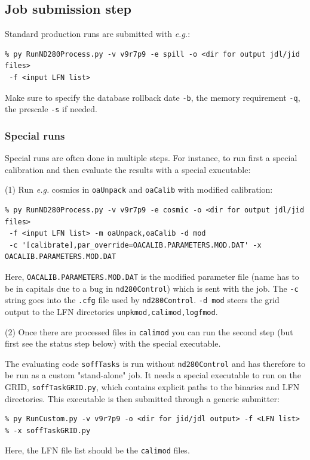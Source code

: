 \documentclass[11pt]{article}
\begin{document}
\subsection{Job submission step}

Standard production runs are submitted with \textit{e.g.}:
\begin{verbatim}
% py RunND280Process.py -v v9r7p9 -e spill -o <dir for output jdl/jid files>
 -f <input LFN list>
\end{verbatim}

Make sure to specify the database rollback date \verb+-b+, the memory
requirement \verb+-q+, the prescale \verb+-s+ if needed.

\subsubsection*{Special runs}

Special runs are often done in multiple steps. For instance, to run
first a special calibration and then evaluate the results with a
special exucutable:

(1) Run \textit{e.g.} cosmics in \verb+oaUnpack+ and \verb+oaCalib+ with modified calibration:
\begin{verbatim}
% py RunND280Process.py -v v9r7p9 -e cosmic -o <dir for output jdl/jid files>
 -f <input LFN list> -m oaUnpack,oaCalib -d mod 
 -c '[calibrate],par_override=OACALIB.PARAMETERS.MOD.DAT' -x OACALIB.PARAMETERS.MOD.DAT
\end{verbatim}
Here, \verb+OACALIB.PARAMETERS.MOD.DAT+ is the modified parameter file
(name has to be in capitals due to a bug in \verb+nd280Control+) which
is sent with the job. The \verb+-c+ string goes into the \verb+.cfg+
file used by \verb+nd280Control+. \verb+-d mod+ steers the grid output
to the LFN directories \verb+unpkmod,calimod,logfmod+. 

(2) Once there are processed files in \verb+calimod+ you can run the second step (but first see the status step below) with the special executable.

The evaluating code \verb+soffTasks+ is run without
\verb+nd280Control+ and has therefore to be run as a custom
"stand-alone" job. It needs a special executable to run on the GRID,
\verb+soffTaskGRID.py+, which contains explicit paths to the binaries
and LFN directories. This executable is then submitted through a
generic submitter:
\begin{verbatim}
% py RunCustom.py -v v9r7p9 -o <dir for jid/jdl output> -f <LFN list>
% -x soffTaskGRID.py
\end{verbatim}
Here, the LFN file list should be the \verb+calimod+ files.
\end{document}
